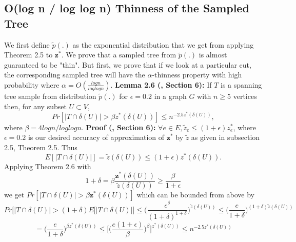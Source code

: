 \documentclass[oneside]{projectpaper} %
\begin{document}
\subsection{O(log n / log log n) Thinness of the Sampled Tree}
We first define $\tilde{p}(.)$ as the exponential distribution that we get from applying Theorem 2.5 to $\textbf{z}^*$. We prove that a sampled tree from $\tilde{p}(.)$ is almost guaranteed to be "thin". But first, we prove that if we look at a particular cut, the corresponding sampled tree will have the $\alpha$-thinness property with high probability where $\alpha = O(\frac{logn}{loglogn})$.
\newline
\newline
\textbf{Lemma 2.6 (\cite{AGM10}, Section 6):} If $T$ is a spanning tree sample from distribution $\tilde{p}(.)$ for $\epsilon = 0.2$ in a graph $G$ with $n \geq 5$ vertices then, for any subset $U \subset V$,
\begin{equation*}
Pr[|T \cap \delta(U)| > \beta z^*(\delta(U))] \leq n^{-2.5z^*(\delta(U))},
\end{equation*}
where $\beta = 4 logn / loglogn$.
\newline
\newline
\textbf{Proof (\cite{AGM10}, Section 6):} $\forall e \in E, \tilde{z}_e \leq (1 + \epsilon)z_{e}^{*}$, where $\epsilon = 0.2$ is our desired accuracy of approximation of $\textbf{z}^*$ by $\tilde{z}$ as given in subsection 2.5, Theorem 2.5. Thus
\begin{equation*}
E[|T \cap \delta(U)|] = \tilde{z}(\delta(U)) \leq (1 + \epsilon)z^*(\delta(U)).
\end{equation*}
Applying Theorem 2.6 with
\begin{equation*}
1 + \delta = \beta \frac{\textbf{z}^*(\delta(U))}{\tilde{z}(\delta(U))} \geq \frac{\beta}{1 + \epsilon}
\end{equation*}
we get $Pr[|T \cap \delta(U)| > \beta \textbf{z}^*(\delta(U))]$ which can be bounded from above by
\begin{equation*}
Pr\Big[|T \cap \delta(U)| > (1 + \delta)E[|T \cap \delta(U)|\Big] \leq \bigg(\frac{e^{\delta}}{(1 + \delta)^{1 + \delta}}\bigg)^{\tilde{z}(\delta(U))} \leq \bigg(\frac{e}{1 + \delta}\bigg)^{(1 + \delta)\tilde{z}(\delta(U))}
\end{equation*}
\begin{equation*}
= \bigg(\frac{e}{1 + \delta}\bigg)^{\beta z^*(\delta(U))} \leq \Bigg[\bigg(\frac{e(1 + \epsilon)}{\beta}\bigg)^\beta\Bigg]^{z^*(\delta(U))} \leq n^{-2.5z^*(\delta(U))}
\end{equation*}
\end{document}
